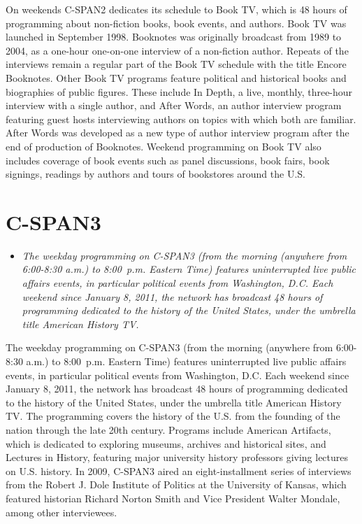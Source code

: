 On weekends C-SPAN2 dedicates its schedule to Book TV, which is 48 hours
of programming about non-fiction books, book events, and authors. Book
TV was launched in September 1998. Booknotes was originally broadcast
from 1989 to 2004, as a one-hour one-on-one interview of a non-fiction
author. Repeats of the interviews remain a regular part of the Book TV
schedule with the title Encore Booknotes. Other Book TV programs feature
political and historical books and biographies of public figures. These
include In Depth, a live, monthly, three-hour interview with a single
author, and After Words, an author interview program featuring guest
hosts interviewing authors on topics with which both are familiar. After
Words was developed as a new type of author interview program after the
end of production of Booknotes. Weekend programming on Book TV also
includes coverage of book events such as panel discussions, book fairs,
book signings, readings by authors and tours of bookstores around the
U.S.

\section{C-SPAN3}\label{c-span3}

\begin{itemize}
\item
  \emph{The weekday programming on C-SPAN3 (from the morning (anywhere
  from 6:00-8:30 a.m.) to 8:00~p.m. Eastern Time) features uninterrupted
  live public affairs events, in particular political events from
  Washington, D.C. Each weekend since January 8, 2011, the network has
  broadcast 48 hours of programming dedicated to the history of the
  United States, under the umbrella title American History TV.}
\end{itemize}

The weekday programming on C-SPAN3 (from the morning (anywhere from
6:00-8:30 a.m.) to 8:00~p.m. Eastern Time) features uninterrupted live
public affairs events, in particular political events from Washington,
D.C. Each weekend since January 8, 2011, the network has broadcast 48
hours of programming dedicated to the history of the United States,
under the umbrella title American History TV. The programming covers the
history of the U.S. from the founding of the nation through the late
20th century. Programs include American Artifacts, which is dedicated to
exploring museums, archives and historical sites, and Lectures in
History, featuring major university history professors giving lectures
on U.S. history. In 2009, C-SPAN3 aired an eight-installment series of
interviews from the Robert J. Dole Institute of Politics at the
University of Kansas, which featured historian Richard Norton Smith and
Vice President Walter Mondale, among other interviewees.

